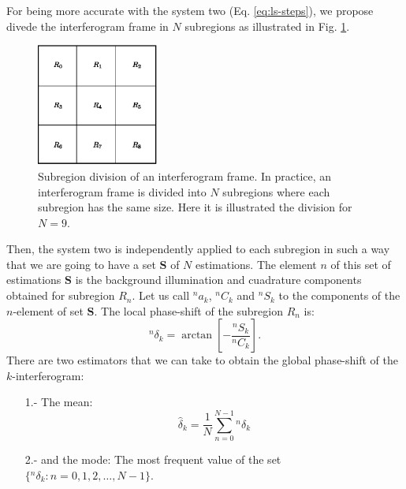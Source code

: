 \documentclass[letterpaper,12pt]{article}   %
\begin{document}
For being more accurate with the system two (Eq. \eqref{eq:ls-steps}),
we propose divede the interferogram frame in $N$ subregions as
illustrated in Fig. \ref{fig:subregions}.
\begin{figure}
  \centering
  \includegraphics[width=4cm]{regions.eps}
  \caption{Subregion division of an interferogram frame. In practice,
    an interferogram frame is divided into $N$ subregions where each
    subregion has the same size. Here it is illustrated the division
    for $N=9$.\label{fig:subregions}}
\end{figure}
Then, the system two is independently applied to each subregion in
such a way that we are going to have a set $\mathbf{S}$ of $N$
estimations. The element $n$ of this set of estimations $\mathbf{S}$
is the background illumination and cuadrature components obtained for
subregion $R_n$. Let us call $^na_k$, $^nC_k$ and $^nS_k$ to the
components of the $n$-element of set $\mathbf{S}$. The local
phase-shift of the subregion $R_n$ is:
\begin{equation}
  ^n\delta_k = \arctan\left[-\frac{^nS_k}{^nC_k}\right].
\end{equation}
There are two estimators that we can take to obtain the global
phase-shift of the $k$-interferogram:
\begin{itemize}
\item[1.-] The mean:
  \begin{equation}
    \hat\delta_k = \frac{1}{N} \sum_{n=0}^{N-1} {^n\delta_k}
  \end{equation}
\item[2.-] and the mode: The most frequent value of the set $\{
  {^n\delta_k}: n=0,1,2,\dots,N-1 \}$.
\end{itemize}


 
\end{document}
